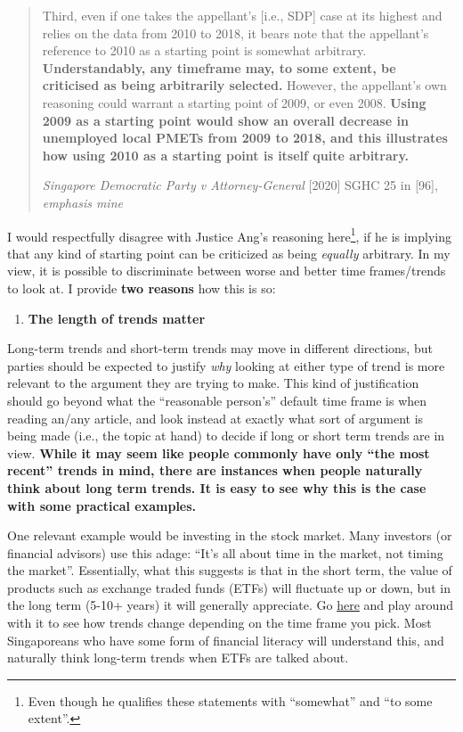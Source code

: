 \documentclass[openany]{book}
\providecommand{\tightlist}{%
  \setlength{\itemsep}{0pt}\setlength{\parskip}{0pt}}
\let\rmarkdownfootnote\footnote%
\def\footnote{\protect\rmarkdownfootnote}
\begin{document}
\begin{quote}
Third, even if one takes the appellant's {[}i.e., SDP{]} case at its
highest and relies on the data from 2010 to 2018, it bears note that the
appellant's reference to 2010 as a starting point is somewhat arbitrary.
\textbf{Understandably, any timeframe may, to some extent, be criticised
as being arbitrarily selected.} However, the appellant's own reasoning
could warrant a starting point of 2009, or even 2008. \textbf{Using 2009
as a starting point would show an overall decrease in unemployed local
PMETs from 2009 to 2018, and this illustrates how using 2010 as a
starting point is itself quite arbitrary.}

\emph{Singapore Democratic Party v Attorney-General} {[}2020{]} SGHC 25
in {[}96{]}, \emph{emphasis mine}
\end{quote}

I would respectfully disagree with Justice Ang's reasoning
here\footnote{Even though he qualifies these statements with
  ``somewhat'' and ``to some extent''.}, if he is implying that any kind
of starting point can be criticized as being \emph{equally} arbitrary.
In my view, it is possible to discriminate between worse and better time
frames/trends to look at. I provide \textbf{two reasons} how this is so:

\begin{enumerate}
\def\labelenumi{\arabic{enumi}.}
\tightlist
\item
  \textbf{The length of trends matter}
\end{enumerate}

Long-term trends and short-term trends may move in different directions,
but parties should be expected to justify \emph{why} looking at either
type of trend is more relevant to the argument they are trying to make.
This kind of justification should go beyond what the ``reasonable
person's'' default time frame is when reading an/any article, and look
instead at exactly what sort of argument is being made (i.e., the topic
at hand) to decide if long or short term trends are in view.
\textbf{While it may seem like people commonly have only ``the most
recent'' trends in mind, there are instances when people naturally think
about long term trends. It is easy to see why this is the case with some
practical examples.}

One relevant example would be investing in the stock market. Many
investors (or financial advisors) use this adage: ``It's all about time
in the market, not timing the market''. Essentially, what this suggests
is that in the short term, the value of products such as exchange traded
funds (ETFs) will fluctuate up or down, but in the long term (5-10+
years) it will generally appreciate. Go
\href{https://www2.sgx.com/indices/products/sti}{here} and play around
with it to see how trends change depending on the time frame you pick.
Most Singaporeans who have some form of financial literacy will
understand this, and naturally think long-term trends when ETFs are
talked about.
\end{document}
